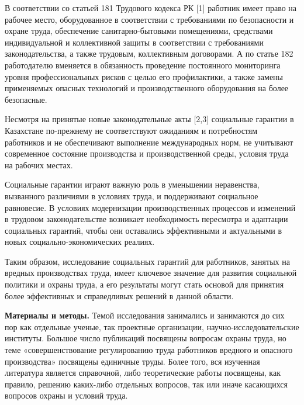 В соответствии со статьей 181 Трудового кодекса РК {[}1{]} работник
имеет право на рабочее место, оборудованное в соответствии с
требованиями по безопасности и охране труда, обеспечение
санитарно-бытовыми помещениями, средствами индивидуальной и коллективной
защиты в соответствии с требованиями законодательства, а также трудовым,
коллективным договорами. А по статье 182 работодателю вменяется в
обязанность проведение постоянного мониторинга уровня профессиональных
рисков с целью его профилактики, а также замены применяемых опасных
технологий и производственного оборудования на более безопасные.

Несмотря на принятые новые законодательные акты {[}2,3{]} социальные
гарантии в Казахстане по-прежнему не соответствуют ожиданиям и
потребностям работников и не обеспечивают выполнение международных норм,
не учитывают современное состояние производства и производственной
среды, условия труда на рабочих местах.

Социальные гарантии играют важную роль в уменьшении неравенства,
вызванного различиями в условиях труда, и поддерживают социальное
равновесие. В условиях модернизации производственных процессов и
изменений в трудовом законодательстве возникает необходимость пересмотра
и адаптации социальных гарантий, чтобы они оставались эффективными и
актуальными в новых социально-экономических реалиях.

Таким образом, исследование социальных гарантий для работников, занятых
на вредных производствах труда, имеет ключевое значение для развития
социальной политики и охраны труда, а его результаты могут стать основой
для принятия более эффективных и справедливых решений в данной области.

{\bfseries Материалы и методы.} Темой исследования занимались и занимаются
до сих пор как отдельные ученые, так проектные организации,
научно-исследовательские институты. Большое число публикаций посвящены
вопросам охраны труда, но теме «совершенствование регулированию труда
работников вредного и опасного производства» посвящены единичные труды.
Более того, вся изученная литература является справочной, либо
теоретические работы посвящены, как правило, решению каких-либо
отдельных вопросов, так или иначе касающихся вопросов охраны и условий
труда.

